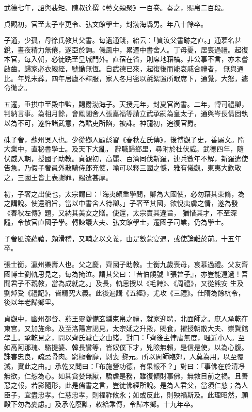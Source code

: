 \begin{pinyinscope}
 武德七年，詔與裴矩、陳叔達撰《藝文類聚》一百卷。奏之，賜帛二百段。



 貞觀初，官至太子率更令、弘文館學士，封渤海縣男。年八十餘卒。



 子通，少孤，母徐氏教其父書。每遺通錢，紿云：「質汝父書跡之直。」通慕名甚銳，晝夜精力無倦，遂亞於詢。儀鳳中，累遷中書舍人。丁母憂，居喪過禮。起復本官，每入朝，必徒跣至皇城門外。直宿在省，則席地藉槁。非公事不言，亦未嘗啟齒。歸家必衣縗絰，號慟無恆。自武德已來，起復後而能哀戚合禮者，
 無與通比。年兇未葬，四年居廬不釋服，家人冬月密以氈絮置所眠席下，通覺，大怒，遽令徹之。



 五遷，垂拱中至殿中監，賜爵渤海子。天授元年，封夏官尚書。二年，轉司禮卿，判納言事。為相月餘，會鳳閣舍人張嘉福等請立武承嗣為皇太子，通與岑長倩固執以為不可，遂忤諸武意，為酷吏所陷，被誅。神龍初，追復官爵。



 硃子奢，蘇州吳人也。少從鄉人顧彪習《春秋左氏傳》，後博觀子史，善屬文。隋大業中，直秘書學士。及天下大亂，
 辭職歸鄉里，尋附於杜伏威。武德四年，隨伏威入朝，授國子助教。貞觀初，高麗、百濟同伐新羅，連兵數年不解，新羅遣使告急。乃假子奢員外散騎侍郎充使，喻可以釋三國之憾，雅有儀觀，東夷大欽敬之，三國王皆上表謝罪，賜遣甚厚。



 初，子奢之出使也，太宗謂曰：「海夷頗重學問，卿為大國使，必勿藉其束脩，為之講說。使還稱旨，當以中書舍人待卿。」子奢至其國，欲悅夷虜之情，遂為發《春秋左傳》題，又納其美女之贈。使還，太宗責其違旨，
 猶惜其才，不至深譴，令散官直國子學。轉諫議大夫、弘文館學士，遷國子司業，仍為學士。



 子奢風流蘊藉，頗滑稽，又輔之以文義，由是數蒙宴遇，或使論難於前。十五年卒。



 張士衡，瀛州樂壽人也。父之慶，齊國子助教。士衡九歲喪母，哀慕過禮。父友齊國博士劉軌思見之，每為掩泣。謂其父曰：「昔伯饒號『張曾子』，亦豈能遠過！吾聞君子不親教，當為成就之。」及長，軌思授以《毛詩》、《周禮》，又從熊安
 生及劉焯受《禮記》，皆精究大義。此後遍講《五經》，尤攻《三禮》。仕隋為餘杭令，後以年老歸鄉里。



 貞觀中，幽州都督、燕王靈夔備玄纁束帛之禮，就家迎聘，北面師之。庶人承乾在東宮，又加旌命。及至洛陽宮謁見，太宗延之升殿，賜食，擢授朝散大夫、崇賢館學士。承乾見之，問以齊氏滅亡之由緒，對曰：「齊後主悖虐無度，暱近小人。至如高阿那瑰、駱提婆、韓長鸞等，皆奴僕下才，兇險無賴，是信是使，以為心腹。誅害忠良，疏忌骨肉。窮極奢靡，剝喪
 黎元。所以周師臨郊，人莫為用，以至覆滅，實此之由。」承乾又問曰：「布施營功德，有果報不？」對曰：「事佛在於清凈無欲，仁恕為心。如其貪婪無厭，驕虐是務，雖復傾財事佛，無救目前之禍。且善惡之報，若影隨形，此是儒書之言，豈徒佛經所說。是為人君父，當須仁慈；為人臣子，宜盡忠孝。仁慈忠孝，則福祚攸永；如或反此，則殃禍斯及。此理昭然，願殿下勿為憂慮。」及承乾廢黜，敕給乘傳，令歸本鄉。十九年卒。




\end{pinyinscope}
